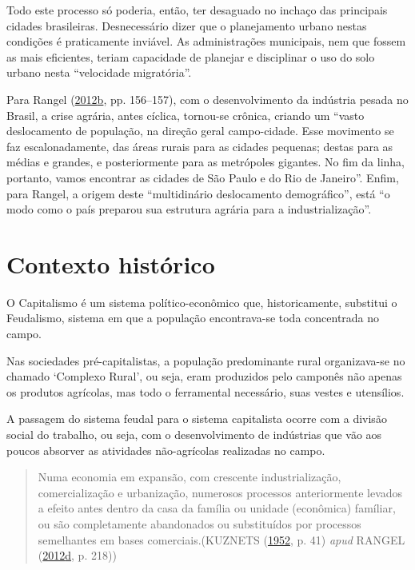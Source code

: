 \documentclass[a4paper, 12pt]{article}
\begin{document}
Todo este processo só poderia, então, ter desaguado no inchaço das
principais cidades brasileiras. Desnecessário dizer que o planejamento
urbano nestas condições é praticamente inviável. As administrações
municipais, nem que fossem as mais eficientes, teriam capacidade de
planejar e disciplinar o uso do solo urbano nesta ``velocidade
migratória''.

Para Rangel
(\protect\hyperlink{ref-rangel1988}{2012}\protect\hyperlink{ref-rangel1988}{b},
pp. 156--157), com o desenvolvimento da indústria pesada no Brasil, a
crise agrária, antes cíclica, tornou-se crônica, criando um ``vasto
deslocamento de população, na direção geral campo-cidade. Esse movimento
se faz escalonadamente, das áreas rurais para as cidades pequenas;
destas para as médias e grandes, e posteriormente para as metrópoles
gigantes. No fim da linha, portanto, vamos encontrar as cidades de São
Paulo e do Rio de Janeiro''. Enfim, para Rangel, a origem deste
``multidinário deslocamento demográfico'', está ``o modo como o país
preparou sua estrutura agrária para a industrialização''.

\hypertarget{contexto-historico}{%
\section{Contexto histórico}\label{contexto-historico}}

O Capitalismo é um sistema político-econômico que, historicamente,
substitui o Feudalismo, sistema em que a população encontrava-se toda
concentrada no campo.

Nas sociedades pré-capitalistas, a população predominante rural
organizava-se no chamado `Complexo Rural', ou seja, eram produzidos pelo
camponês não apenas os produtos agrícolas, mas todo o ferramental
necessário, suas vestes e utensílios.

A passagem do sistema feudal para o sistema capitalista ocorre com a
divisão social do trabalho, ou seja, com o desenvolvimento de indústrias
que vão aos poucos absorver as atividades não-agrícolas realizadas no
campo.

\begin{quote}
Numa economia em expansão, com crescente industrialização,
comercialização e urbanização, numerosos processos anteriormente levados
a efeito antes dentro da casa da família ou unidade (econômica)
famíliar, ou são completamente abandonados ou substituídos por processos
semelhantes em bases comerciais.(KUZNETS
(\protect\hyperlink{ref-kuznets}{1952}, p. 41) \emph{apud} RANGEL
(\protect\hyperlink{ref-rangel1956}{2012}\protect\hyperlink{ref-rangel1956}{d},
p. 218))
\end{quote}
\end{document}
